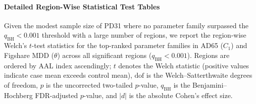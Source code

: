 \documentclass[11pt]{article}
\begin{document}
\paragraph{Detailed Region-Wise Statistical Test Tables}
Given the modest sample size of PD31 where no parameter family surpassed the $q_{\mathrm{BH}}<0.001$ threshold with a large number of regions, we report the region-wise Welch's $t$-test statistics for the top-ranked parameter families in AD65 (\texttt{$C_1$}) and Figshare MDD (\texttt{$\theta$}) across all significant regions ($q_{\mathrm{BH}}<0.001$). Regions are ordered by AAL index ascendingly; $t$ denotes the Welch statistic (positive values indicate case mean exceeds control mean), $\mathrm{dof}$ is the Welch--Satterthwaite degrees of freedom, $p$ is the uncorrected two-tailed $p$-value, $q_{\mathrm{BH}}$ is the Benjamini--Hochberg FDR-adjusted $p$-value, and $|d|$ is the absolute Cohen's effect size.
\end{document}
